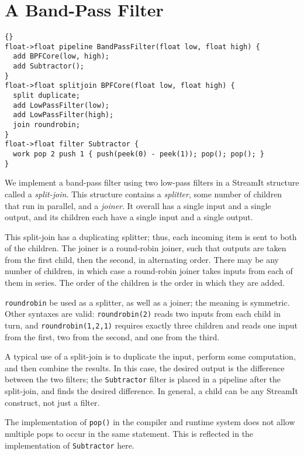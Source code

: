 \section{A Band-Pass Filter}

\begin{lstlisting}{}
float->float pipeline BandPassFilter(float low, float high) {
  add BPFCore(low, high);
  add Subtractor();
}
float->float splitjoin BPFCore(float low, float high) {
  split duplicate;
  add LowPassFilter(low);
  add LowPassFilter(high);
  join roundrobin;
}
float->float filter Subtractor {
  work pop 2 push 1 { push(peek(0) - peek(1)); pop(); pop(); }
}
\end{lstlisting}

We implement a band-pass filter using two low-pass filters in a
StreamIt structure called a \emph{split-join}.  This structure
contains a \emph{splitter}, some number of children that run in
parallel, and a \emph{joiner}.  It overall has a single input and a
single output, and its children each have a single input and a single
output.

This split-join has a duplicating splitter; thus, each incoming item
is sent to both of the children.  The joiner is a round-robin joiner,
such that outputs are taken from the first child, then the second, in
alternating order.  There may be any number of children, in which case
a round-robin joiner takes inputs from each of them in series.  The
order of the children is the order in which they are added.

\lstinline|roundrobin| be used as a splitter, as well as a joiner; the
meaning is symmetric.  Other syntaxes are valid:
\lstinline|roundrobin(2)| reads two inputs from each child in turn,
and \lstinline|roundrobin(1,2,1)| requires exactly three children and
reads one input from the first, two from the second, and one from the
third.

A typical use of a split-join is to duplicate the input, perform some
computation, and then combine the results.  In this case, the desired
output is the difference between the two filters; the
\lstinline|Subtractor| filter is placed in a pipeline after the
split-join, and finds the desired difference.  In general, a child can
be any StreamIt construct, not just a filter.

The implementation of \lstinline|pop()| in the compiler and runtime
system does not allow multiple pops to occur in the same statement.
This is reflected in the implementation of \lstinline|Subtractor|
here.